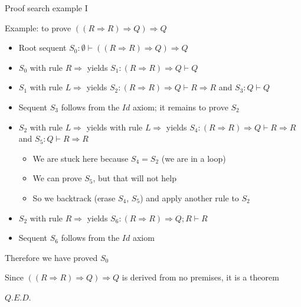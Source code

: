 \documentclass[english]{beamer}
\begin{document}
\begin{frame}{Proof search example I}

Example: to prove $\left(\left(R\Rightarrow R\right)\Rightarrow Q\right)\Rightarrow Q$
\begin{itemize}
\item Root sequent $S_{0}:\emptyset\vdash\left(\left(R\Rightarrow R\right)\Rightarrow Q\right)\Rightarrow Q$
\item $S_{0}$ with rule $R\Rightarrow$ yields $S_{1}:\left(R\Rightarrow R\right)\Rightarrow Q\vdash Q$
\item $S_{1}$ with rule $L\Rightarrow$ yields $S_{2}:\left(R\Rightarrow R\right)\Rightarrow Q\vdash R\Rightarrow R$
and $S_{3}:Q\vdash Q$
\item Sequent $S_{3}$ follows from the $Id$ axiom; it remains to prove
$S_{2}$
\item $S_{2}$ with rule $L\Rightarrow$ yields with rule $L\Rightarrow$ yields $S_{4}:\left(R\Rightarrow R\right)\Rightarrow Q\vdash R\Rightarrow R$
and $S_{5}:Q\vdash R\Rightarrow R$
\begin{itemize}
\item We are stuck here because $S_{4}=S_{2}$ (we are in a loop)
\item We can prove $S_{5}$, but that will not help
\item So we backtrack (erase $S_{4}$, $S_{5}$) and apply another rule
to $S_{2}$
\end{itemize}
\item $S_{2}$ with rule $R\Rightarrow$ yields $S_{6}:\left(R\Rightarrow R\right)\Rightarrow Q;R\vdash R$
\item Sequent $S_{6}$ follows from the $Id$ axiom
\end{itemize}
Therefore we have proved $S_{0}$

Since $\left(\left(R\Rightarrow R\right)\Rightarrow Q\right)\Rightarrow Q$
is derived from no premises, it is a theorem

$Q.E.D.$
\end{frame}
\end{document}
